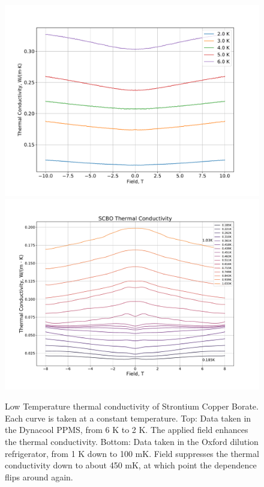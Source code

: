 \documentclass{thesis-umich}
\begin{document}
\begin{figure}
	\centering
	\caption[Low Temperature Thermal Conductivity of SCBO]{Low Temperature thermal conductivity of Strontium Copper Borate. Each curve is taken at a constant temperature. Top: Data taken in the Dynacool PPMS, from 6 K to 2 K. The applied field enhances the thermal conductivity. Bottom: Data taken in the Oxford dilution refrigerator, from 1 K down to 100 mK. Field suppresses the thermal conductivity down to about 450 mK, at which point the dependence flips around again.}
	\label{fig:SCBO_kappa_xx}
	\centering
	\includegraphics[width=0.85\columnwidth,trim={1cm 1cm 1cm 1cm},clip]{figures/SCBO_tcond_high.pdf}
	\includegraphics[width=0.85\columnwidth,trim={1cm 1cm 1cm 1cm},clip]{figures/SCBO_kappa_xx_vs_B_1.pdf}
\end{figure}
\end{document}
